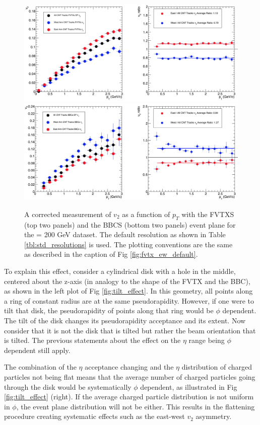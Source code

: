 \begin{figure}[!ht]
\begin{center}
\includegraphics[width=0.85\linewidth]{figs/fvtx_vertex_rot_only.png}
\includegraphics[width=0.85\linewidth]{figs/bbc_vertex_rot_only.png}
\caption{A corrected measurement of $v_{2}$ as a function of $p_T$ with the FVTXS (top two panels) and the BBCS (bottom two panels) event plane for the \pau \sqsn = 200 GeV dataset. The default resolution as shown in Table \ref{tbl:std_resolutions} is used. The plotting conventions are the same as described in the caption of Fig \ref{fig:fvtx_ew_default}. }
\label{fig:fvtx_ew_rot}
\end{center}
\end{figure}

To explain this effect, consider a cylindrical disk with a hole in the middle, centered about the z-axis (in analogy to the shape of the FVTX and the BBC), as shown in the left plot of Fig \ref{fig:tilt_effect}. In this geometry, all points along a ring of constant radius are at the same pseudorapidity. However, if one were to tilt that disk, the pseudorapidity of points along that ring would be $\phi$ dependent. The tilt of the disk changes its pseudorapidity acceptance and its extent. Now consider that it is not the disk that is tilted but rather the beam orientation that is tilted. The previous statements about the effect on the $\eta$ range being $\phi$ dependent still apply. 

The combination of the $\eta$ acceptance changing and the $\eta$ distribution of charged particles not being flat means that the average number of charged particles going through the disk would be systematically $\phi$ dependent, as illustrated in Fig \ref{fig:tilt_effect} (right). If the average charged particle distribution is not uniform in $\phi$, the event plane distribution will not be either. This results in the flattening procedure creating systematic effects such as the east-west $v_2$ asymmetry.

